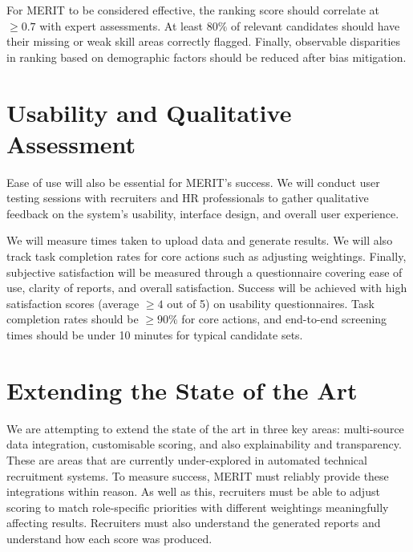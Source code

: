 For MERIT to be considered effective, the ranking score should correlate at $\geq 0.7$ with expert assessments.
At least $80\%$ of relevant candidates should have their missing or weak skill areas correctly flagged.
Finally, observable disparities in ranking based on demographic factors should be reduced after bias mitigation.

\section{Usability and Qualitative Assessment}

Ease of use will also be essential for MERIT's success.
We will conduct user testing sessions with recruiters and HR professionals to gather qualitative feedback on the system's usability, interface design, and overall user experience.

We will measure times taken to upload data and generate results.
We will also track task completion rates for core actions such as adjusting weightings.
Finally, subjective satisfaction will be measured through a questionnaire covering ease of use, clarity of reports, and overall satisfaction.
Success will be achieved with high satisfaction scores (average $\geq 4$ out of 5) on usability questionnaires.
Task completion rates should be $\geq 90\%$ for core actions, and end-to-end screening times should be under 10 minutes for typical candidate sets.

\section{Extending the State of the Art}
We are attempting to extend the state of the art in three key areas: multi-source data integration, customisable scoring, and also explainability and transparency.
These are areas that are currently under-explored in automated technical recruitment systems.
To measure success, MERIT must reliably provide these integrations within reason.
As well as this, recruiters must be able to adjust scoring to match role-specific priorities with different weightings meaningfully affecting results.
Recruiters must also understand the generated reports and understand how each score was produced.
